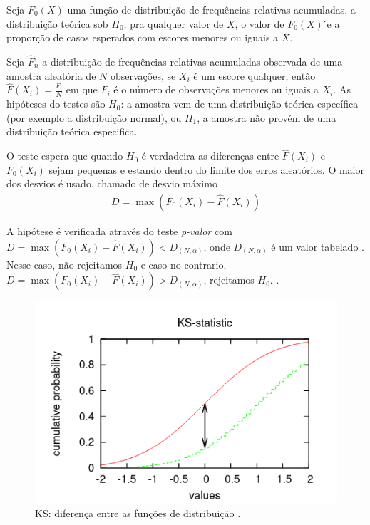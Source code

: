 Seja $F_0(X)$ uma função de distribuição de frequências relativas acumuladas, a distribuição teórica sob $H_0$, pra qualquer valor de $X$, o valor de $F_0(X)$  ́e a proporção de casos esperados com escores menores ou iguais a $X$.

Seja $\hat{F}_n$ a distribuição de frequências relativas acumuladas observada de uma amostra aleatória de $N$ observações, se $X_i$ é um escore qualquer, então $\hat{F}(X_i) = \frac{F_i}{N}$ em que $F_i$ é o número de observações menores ou iguais a $X_i$. As hipóteses do testes são $H_0$: a amostra vem de uma distribuição teórica específica (por exemplo a distribuição normal), ou $H_1$, a amostra não provém de uma distribuição teórica especifica.

O teste espera que quando $H_0$ é verdadeira as diferenças entre $\hat{F}(X_i)$ e $F_0(X_i)$ sejam pequenas e estando dentro do limite dos erros aleatórios. O maior dos desvios é usado, chamado de desvio máximo
\begin{gather}
    D = \max(F_0(X_i)-\hat{F}(X_i))
\end{gather}

A hipótese é verificada através do teste \textit{p-valor} com $D = \max(F_0(X_i)-\hat{F}(X_i)) < D_{(N,\alpha)}$, onde $D_{(N,\alpha)}$ é um valor tabelado . Nesse caso, não rejeitamos $H_0$ e caso no contrario, $D = \max(F_0(X_i)-\hat{F}(X_i)) > D_{(N,\alpha)}$, rejeitamos $H_0$. \cite{bussab}.
\begin{figure}[H]
 \caption{KS: diferença entre as funções de distribuição \cite{ashwin}.}
 \label{fig:roc_kuhn}
 \centering
 \includegraphics[scale=0.6]{images/ks_statis.png}
\end{figure}

